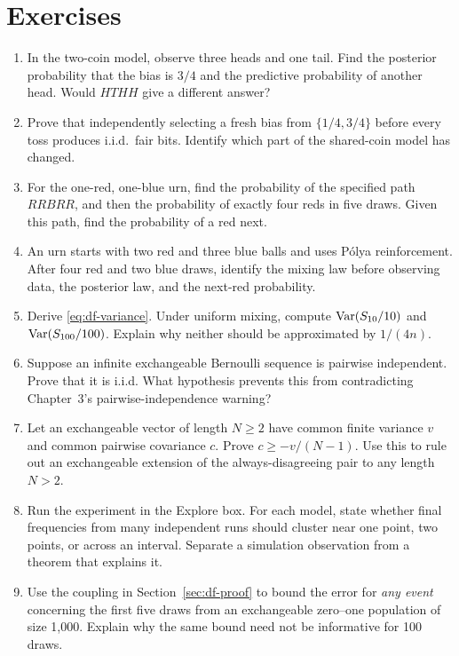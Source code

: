 \section{Exercises}
\label{sec:df-exercises}
\begin{exercisebox}[title={Exchangeability practice}]
\begin{enumerate}
  \item In the two-coin model, observe three heads and one tail. Find the posterior probability that the bias is $3/4$ and the predictive probability of another head. Would $HTHH$ give a different answer? 
  \item Prove that independently selecting a fresh bias from $\{1/4,3/4\}$ before every toss produces i.i.d.\ fair bits. Identify which part of the shared-coin model has changed. 
  \item For the one-red, one-blue urn, find the probability of the specified path $RRBRR$, and then the probability of exactly four reds in five draws. Given this path, find the probability of a red next. 
  \item An urn starts with two red and three blue balls and uses P\'olya reinforcement. After four red and two blue draws, identify the mixing law before observing data, the posterior law, and the next-red probability. 
  \item Derive \eqref{eq:df-variance}. Under uniform mixing, compute $\operatorname{Var}(S_{10}/10)$ and $\operatorname{Var}(S_{100}/100)$. Explain why neither should be approximated by $1/(4n)$. 
  \item Suppose an infinite exchangeable Bernoulli sequence is pairwise independent. Prove that it is i.i.d. What hypothesis prevents this from contradicting Chapter~3's pairwise-independence warning? 
  \item Let an exchangeable vector of length $N\ge2$ have common finite variance $v$ and common pairwise covariance $c$. Prove $c\ge-v/(N-1)$. Use this to rule out an exchangeable extension of the always-disagreeing pair to any length $N>2$. 
  \item Run the experiment in the Explore box. For each model, state whether final frequencies from many independent runs should cluster near one point, two points, or across an interval. Separate a simulation observation from a theorem that explains it. 
  \item Use the coupling in Section~\ref{sec:df-proof} to bound the error for \emph{any event} concerning the first five draws from an exchangeable zero--one population of size 1,000. Explain why the same bound need not be informative for 100 draws. 
\end{enumerate}
\end{exercisebox}

